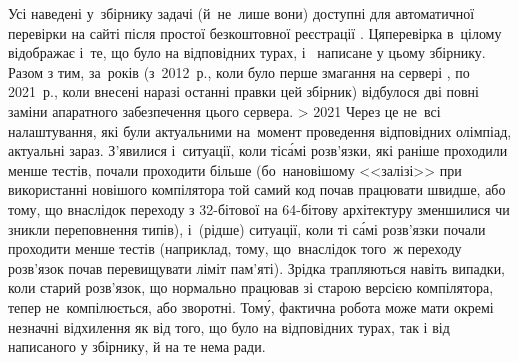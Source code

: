 Усі наведені у~збірнику задачі (й~не~лише вони) доступні для автоматичної перевірки на сайті \EjudgeCkipoName{} після простої безкоштовної реєстрації%
. Ця\nolinebreak[3] %
перевірка в~цілому відображає і~те, що було на відповідних турах, і~%
написане у цьому збірнику.
%
Разом з тим, 
за~років 
(з~2012~р., 
коли було
перше змагання на сервері \EjudgeCkipoName, по 2021~р., коли внесені наразі останні правки цей збірник)
відбулося дві повні заміни апаратного забезпечення цього сервера.
\ifnum\number\year > 2021
\ERROR %
\fi
Через це
не~всі налаштування, які були актуальними на~момент проведення відповідних олімпіад, актуальні зараз. З'явилися і~ситуації, коли ті\nolinebreak[3] с\'{а}мі розв'язки, які раніше проходили менше тестів, почали проходити більше (бо~на\nolinebreak[3] новішому <<залізі>> при використанні новішого компілятора той самий код почав працювати швидше, або тому, що внаслідок переходу з \mbox{32-}\nolinebreak[3]біто\-вої на \mbox{64-}\nolinebreak[3]біто\-ву архітектуру зменшилися чи зникли переповнення типів), і~(рідше) ситуації, коли ті с\'{а}мі розв'язки почали проходити менше тестів (наприклад, тому, що~внаслідок того~ж переходу розв'язок почав перевищувати ліміт пам'яті). Зрідка трапляються навіть випадки, коли старий розв'язок, що нормально працював зі старою версією компілятора, тепер не~компілюється, або зворотні. Том\'{у}, фактична робота \EjudgeCkipoName{} може мати окремі незначні відхилення як від того, що було на відповідних турах, так і від написаного у збірнику, й на те нема ради.

\vspace{1pt plus 1in}